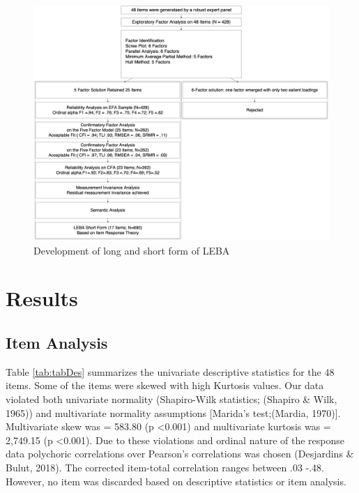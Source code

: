 \documentclass[
  english,
  man]{apa6}
\begin{document}
\begin{figure}

{\centering \includegraphics[width=1\linewidth,height=1.6\textheight]{Manuscript.figures/Flowchart1} 

}

\caption{Development of long and short form of LEBA}\label{fig:FlowchartFig}
\end{figure}

\hypertarget{results}{%
\section{Results}\label{results}}

\hypertarget{item-analysis}{%
\subsection{Item Analysis}\label{item-analysis}}

Table \ref{tab:tabDes} summarizes the univariate descriptive statistics for the 48 items. Some of the items were skewed with high Kurtosis values. Our data violated both univariate normality (Shapiro-Wilk statistics; (Shapiro \& Wilk, 1965)) and multivariate normality assumptions {[}Marida's test;(Mardia, 1970){]}. Multivariate skew was = 583.80 (p \textless0.001) and multivariate kurtosis was = 2,749.15 (p \textless0.001). Due to these violations and ordinal nature of the response data polychoric correlations over Pearson's correlations was chosen (Desjardins \& Bulut, 2018). The corrected item-total correlation ranges between .03 -.48. However, no item was discarded based on descriptive statistics or item analysis.
\end{document}

